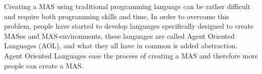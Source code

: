 \indent Creating a MAS using traditional programming language can be rather difficult and require both programming skills and time, In order to overcome this problem, people have started to develop languages specifically designed to create MASes and MAS-environments, these languages are called Agent Oriented Languages (AOL), and what they all have in common is added abstraction. Agent Oriented Languages ease the process of creating a MAS and therefore more people can create a MAS.
  